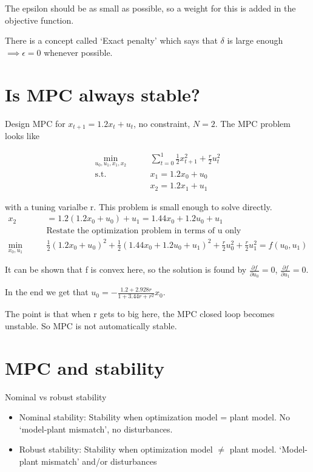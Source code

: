 \documentclass{article}
\begin{document}
The epsilon should be as small as possible, so a weight for this is added in the objective function. 

\medskip There is a concept called `Exact penalty' which says that $\delta$ is large enough $ \implies \epsilon = 0$ whenever possible. 

\section{Is MPC always stable?}

Design MPC for $x_{t+1} = 1.2x_t + u_t$, no constraint, $N = 2$. The MPC problem looks like

\begin{align*}
  \min_{u_0, u_1, x_1, x_2}\qquad& \sum_{t = 0}^{1} \frac{1}{2} x_{t+1}^2 + \frac{r}{2} u_t^2  \\ 
  \text{s.t.}\qquad& x_1 = 1.2x_0 + u_0 \\ 
  & x_2 = 1.2 x_1 + u_1
\end{align*}

with a tuning varialbe r. This problem is small enough to solve directly. 
\begin{align*}
  x_2 &= 1.2(1.2x_0 + u_0) + u_1 = 1.44x_0 + 1.2u_0 + u_1 \\ 
  &\text{Restate the optimization problem in terms of u only} \\ 
  \min_{x_0, u_1} \qquad & \frac{1}{2}(1.2x_0+u_0)^2 + \frac{1}{2}(1.44x_0 + 1.2u_0 + u_1)^2 + \frac{r}{2}u_0^2 + \frac{r}{2}u_1^2 = f(u_0, u_1)
\end{align*}

It can be shown that f is convex here, so the solution is found by $\frac{\partial f}{\partial u_0} = 0$, $\frac{\partial f}{\partial u_1} = 0$.

In the end we get that $u_0 = - \frac{1.2+2.928r}{1+3.44r+r^2}x_0$. 

\medskip The point is that when r gets to big here, the MPC closed loop becomes unstable. So MPC is not automatically stable. 

\section{MPC and stability}

Nominal vs robust stability
\begin{itemize}
  \item Nominal stability: Stability when optimization model = plant model. No `model-plant mismatch', no disturbances.
  \item Robust stability: Stability when optimization model $\neq$ plant model. `Model-plant mismatch' and/or disturbances
\end{itemize}
\end{document}
